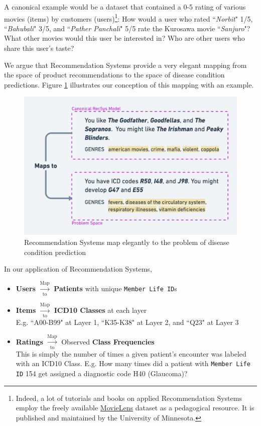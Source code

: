\documentclass[twoside,11pt]{article}
\begin{document}
A canonical example would be a dataset that contained a 0-5 rating of various movies (items) by customers (users)\footnote{Indeed, a lot of tutorials and books on applied Recommendation Systems employ the freely available \href{https://movielens.org/}{MovieLens} dataset as a pedagogical resource. It is published and maintained by the University of Minnesota.}: How would a user who rated ``\textit{Norbit}" 1/5, ``\textit{Bahubali}" 3/5, and ``\textit{Pather Panchali}" 5/5 rate the Kurosawa movie ``\textit{Sanjuro}"? What other movies would this user be interested in? Who are other users who share this user's taste?

\newpage

We argue that Recommendation Systems provide a very elegant mapping from the space of product recommendations to the space of disease condition predictions. Figure \ref{fig:recsys-mapping} illustrates our conception of this mapping with an example.

\begin{figure}[H]
\centering
	\includegraphics[width=1\textwidth]{./images/recsys-mapping.png}
	\caption{Recommendation Systems map elegantly to the problem of disease condition prediction}
	\label{fig:recsys-mapping}
\end{figure}

In our application of Recommendation Systems,

\begin{itemize}
  \item \textbf{Users} $\xrightarrow[\text{to}]{\text{Map}}$ \textbf{Patients} with unique \texttt{Member Life ID}s

  \item \textbf{Items} $\xrightarrow[\text{to}]{\text{Map}}$ \textbf{ICD10 Classes} at each layer \\ E.g. ``A00-B99" at Layer 1, ``K35-K38" at Layer 2, and ``Q23" at Layer 3

  \item \textbf{Ratings} $\xrightarrow[\text{to}]{\text{Map}}$ Observed \textbf{Class Frequencies} \\This is simply the number of times a given patient's encounter was labeled with an ICD10 Class. E.g. How many times did a patient with \texttt{Member Life ID} 154 get assigned a diagnostic code H40 (Glaucoma)?
\end{itemize}
\end{document}
